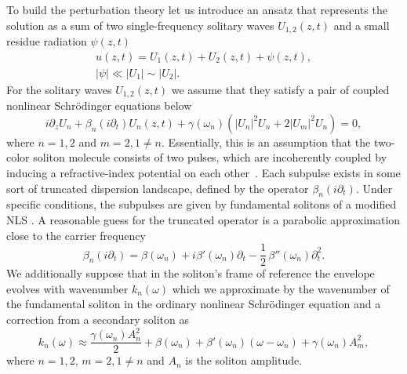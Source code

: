 \documentclass[aps, pra, twocolumn, superscriptaddress, final]{revtex4}
\newcommand{\abs}[1]{\left| #1 \right|}
\begin{document}
\begin{widetext}

\noindent To build the perturbation theory let us introduce an ansatz that
represents the solution as a sum of two single-frequency solitary waves $U_{1,
2}(z, t)$ and a small residue radiation $\psi(z, t)$
\begin{gather}
  \label{eq:PerturbationAnsatz}
  u(z, t) = U_{1}(z, t) + U_{2}(z, t) + \psi(z, t), \\
  \abs{\psi} \ll \abs{U_{1}} \sim \abs{U_{2}}. \nonumber
\end{gather}
For the solitary waves $U_{1, 2}(z, t)$ we assume that they satisfy a pair of
coupled nonlinear Schr\"odinger equations below
\begin{equation}
  \label{eq:CoupledSolitons}
  i \partial_{z} U_{n}
    + \beta_{n}(i \partial_{t}) U_{n}(z, t)
    + \gamma(\omega_{n}) \left(
      \abs{U_{n}}^{2} U_{n} + 2 \abs{U_{m}}^{2} U_{n}
    \right) = 0,
\end{equation}
where $n = 1, 2$ and $m = 2, 1 \ne n$. Essentially, this is an assumption that
the two-color soliton molecule consists of two pulses, which are incoherently
coupled by inducing a refractive-index potential on each
other~\cite{agrawal2013nonlinear}.  Each subpulse exists in some
sort of truncated dispersion landscape, defined by the operator $\beta_{n}(i
\partial_{t})$.
Under specific conditions, the subpulses are given by fundamental solitons of a
modified NLS \cite{Melchert:21}.
A reasonable guess for the truncated operator is a parabolic approximation close
to the carrier frequency
\begin{equation}
  \label{eq:TruncatedDispersionOperator}
  \beta_{n}(i \partial_{t}) =
    \beta(\omega_{n}) +
    i \beta'(\omega_{n}) \partial_{t} -
    \frac{1}{2} \, \beta''(\omega_{n}) \partial_{t}^{2}.
\end{equation}
We additionally suppose that in the soliton's frame of reference the envelope evolves with wavenumber $k_{n}(\omega)$ which we approximate by the wavenumber of the fundamental soliton in the ordinary nonlinear Schr\"odinger equation and a correction from a secondary soliton as
\begin{equation}
  \label{eq:SolitonWavenumber}
  k_{n}(\omega)
    \approx \frac{\gamma(\omega_{n}) A_{n}^{2}}{2}
    + \beta(\omega_{n}) + \beta'(\omega_{n}) (\omega - \omega_{n})
    + \gamma(\omega_{n}) A_{m}^{2},
\end{equation}
where $n = 1, 2$, $m = 2, 1 \ne n$ and $A_{n}$ is the soliton amplitude.


\end{widetext}
\end{document}
